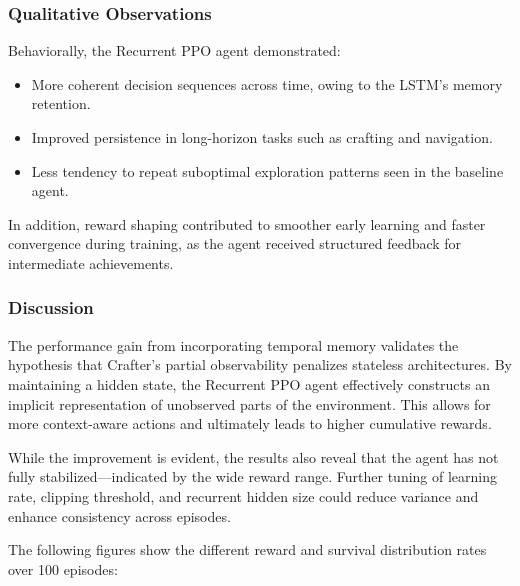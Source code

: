 \documentclass[twocolumn]{article}
\begin{document}
\subsubsection*{Qualitative Observations}

Behaviorally, the Recurrent PPO agent demonstrated:
\begin{itemize}
    \item More coherent decision sequences across time, owing to the LSTM's memory retention.
    \item Improved persistence in long-horizon tasks such as crafting and navigation.
    \item Less tendency to repeat suboptimal exploration patterns seen in the baseline agent.
\end{itemize}

In addition, reward shaping contributed to smoother early learning and faster convergence during training, as the agent received structured feedback for intermediate achievements.

\subsubsection*{Discussion}

The performance gain from incorporating temporal memory validates the hypothesis that Crafter's partial observability penalizes stateless architectures. By maintaining a hidden state, the Recurrent PPO agent effectively constructs an implicit representation of unobserved parts of the environment. This allows for more context-aware actions and ultimately leads to higher cumulative rewards. 

While the improvement is evident, the results also reveal that the agent has not fully stabilized—indicated by the wide reward range. Further tuning of learning rate, clipping threshold, and recurrent hidden size could reduce variance and enhance consistency across episodes.

The following figures show the different reward and survival distribution rates over 100 episodes:
\end{document}
